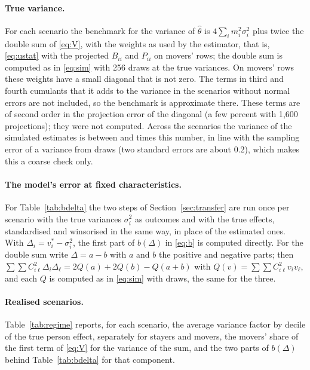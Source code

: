 \paragraph{True variance.} For each scenario the benchmark for the variance of $\hat\theta$ is $4\sum_im_i^2\sigma_i^2$ plus
twice the double sum of \eqref{eq:V}, with the weights as used by the estimator, that is, \eqref{eq:ustat} with
the projected $B_{ii}$ and $P_{ii}$ on movers' rows; the double sum is computed as in \eqref{eq:sim} with 256 draws
at the true variances. On movers' rows these weights have a small diagonal that is not zero. The terms in third
and fourth cumulants that it adds to the variance in the scenarios without normal errors are not included, so
the benchmark is approximate there. These terms are of second order in the projection error of the diagonal
(a few percent with 1{,}600 projections); they were not computed. Across the scenarios the variance of the simulated estimates
is between  and  times this number, in line with the sampling error of a
variance from  draws (two standard errors are about 0.2), which makes this a coarse check only.

\paragraph{The model's error at fixed characteristics.} For Table~\ref{tab:bdelta} the two steps of
Section~\ref{sec:transfer} are run once per scenario with the true variances $\sigma_i^2$ as
outcomes and with the true effects, standardised and winsorised in the same way, in place of the estimated
ones. With $\Delta_i=v_i^*-\sigma_i^2$, the first part of $b(\Delta)$ in \eqref{eq:b} is computed directly. For the
double sum write $\Delta=a-b$ with $a$ and $b$ the positive and negative parts; then
$\sum\sum C_{i\ell}^2\Delta_i\Delta_\ell=2Q(a)+2Q(b)-Q(a+b)$ with $Q(v)=\sum\sum C_{i\ell}^2v_iv_\ell$, and each $Q$
is computed as in \eqref{eq:sim} with  draws, the same for the three.

\paragraph{Realised scenarios.} Table~\ref{tab:regime} reports, for each scenario, the average variance factor
by decile of the true person effect, separately for stayers and movers, the movers' share of the first term of
\eqref{eq:V} for the variance of the sum, and the two parts of $b(\Delta)$ behind Table~\ref{tab:bdelta} for that
component.

